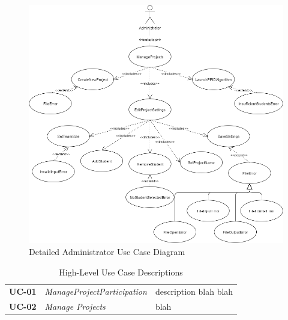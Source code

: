 \documentclass[12pt,letterpaper]{article}
\begin{document}
\begin{figure}[H]
	\centering{}
	\includegraphics[scale=0.5]{imgs/Administrator-Use-Case.png}
	\caption{Detailed Administrator Use Case Diagram}
\end{figure}

\begin{table}[H]
\caption{High-Level Use Case Descriptions}
\renewcommand{\arraystretch}{1.5}
\everyrow{\hline}
\begin{tabu} to 
UC-01 & ManageProjectParticipation & description blah blah \\
UC-02 & Manage Projects & blah \\
\end{tabu}
\end{table}
\end{document}
